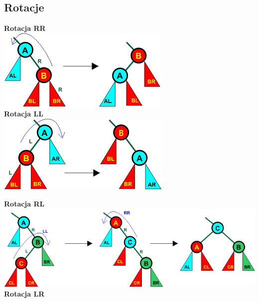 \documentclass[12pt]{article}
\begin{document}
    \subsection{Rotacje}
    \begin{multicols}{2}
    \textbf{Rotacja RR} \\
    
    \includegraphics[width=0.8\linewidth]{graphics/avl-trees/rr-rotation.png}
    \columnbreak \\
    \textbf{Rotacja LL} \\
    
    \includegraphics[width=0.8\linewidth]{graphics/avl-trees/ll-rotation.png}
    \end{multicols}
    
    \textbf{Rotacja RL} \\
    
    \includegraphics[width=\linewidth]{graphics/avl-trees/rl-rotation.png} \\

    \textbf{Rotacja LR} \\
    
\end{document}
